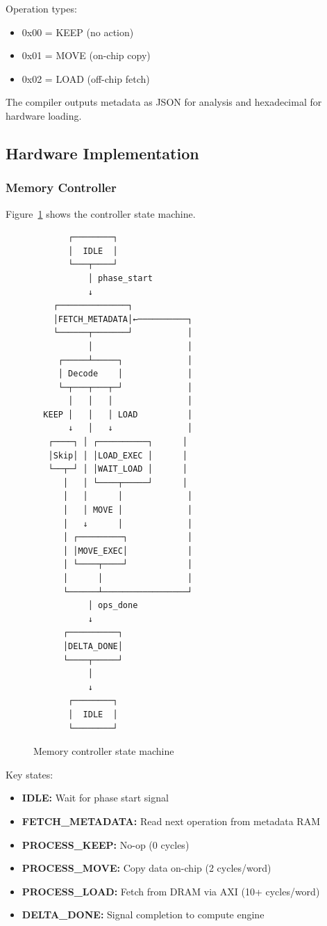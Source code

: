 \documentclass[conference]{IEEEtran}
\begin{document}
Operation types:
\begin{itemize}
\item 0x00 = KEEP (no action)
\item 0x01 = MOVE (on-chip copy)
\item 0x02 = LOAD (off-chip fetch)
\end{itemize}

The compiler outputs metadata as JSON for analysis and hexadecimal for hardware loading.

\subsection{Hardware Implementation}

\subsubsection{Memory Controller}

Figure~\ref{fig:controller_fsm} shows the controller state machine.

\begin{figure}[t]
\centering
\small
\begin{verbatim}
       ┌────────┐
       │  IDLE  │
       └───┬────┘
           │ phase_start
           ↓
    ┌──────────────┐
    │FETCH_METADATA│←──────────┐
    └──────┬───────┘           │
           │                   │
     ┌─────┴─────┐             │
     │ Decode    │             │
     └─┬───┬───┬─┘             │
       │   │   │               │
  KEEP │   │   │ LOAD          │
       ↓   │   ↓               │
   ┌────┐ │ ┌──────────┐      │
   │Skip│ │ │LOAD_EXEC │      │
   └──┬─┘ │ │WAIT_LOAD │      │
      │   │ └────┬─────┘      │
      │   │      │             │
      │   │ MOVE │             │
      │   ↓      │             │
      │ ┌─────────┐            │
      │ │MOVE_EXEC│            │
      │ └────┬────┘            │
      │      │                 │
      └──────┴─────────────────┘
           │ ops_done
           ↓
      ┌──────────┐
      │DELTA_DONE│
      └────┬─────┘
           │
           ↓
       ┌────────┐
       │  IDLE  │
       └────────┘
\end{verbatim}
\caption{Memory controller state machine}
\label{fig:controller_fsm}
\end{figure}

Key states:
\begin{itemize}
\item \textbf{IDLE:} Wait for phase start signal
\item \textbf{FETCH\_METADATA:} Read next operation from metadata RAM
\item \textbf{PROCESS\_KEEP:} No-op (0 cycles)
\item \textbf{PROCESS\_MOVE:} Copy data on-chip (2 cycles/word)
\item \textbf{PROCESS\_LOAD:} Fetch from DRAM via AXI (10+ cycles/word)
\item \textbf{DELTA\_DONE:} Signal completion to compute engine
\end{itemize}
\end{document}
